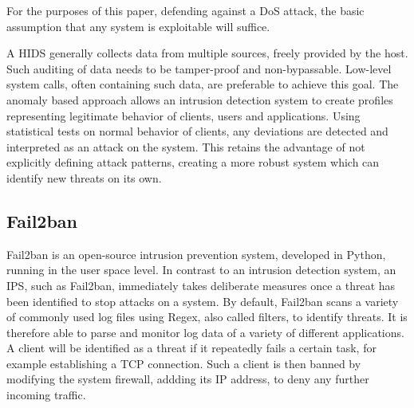 For the purposes of this paper, defending against a \ac{DoS} attack, the basic assumption that any system is exploitable will suffice.

A \ac{HIDS} generally collects data from multiple sources, freely provided by the host.
Such auditing of data needs to be tamper-proof and non-bypassable.
Low-level system calls, often containing such data, are preferable to achieve this goal.
The anomaly based approach allows an intrusion detection system to create profiles representing legitimate behavior of clients, users and applications.
Using statistical tests on normal behavior of clients, any deviations are detected and interpreted as an attack on the system.
This retains the advantage of not explicitly defining attack patterns, creating a more robust system which can identify new threats on its own.\cite{HIDPS}

\subsection{Fail2ban}
Fail2ban is an open-source intrusion prevention system, developed in Python, running in the user space level.
In contrast to an intrusion detection system, an \ac{IPS}, such as Fail2ban, immediately takes deliberate measures once a threat has been identified to stop attacks on a system.
By default, Fail2ban scans a variety of commonly used log files using \ac{Regex}, also called filters, to identify threats.
It is therefore able to parse and monitor log data of a variety of different applications.
A client will be identified as a threat if it repeatedly fails a certain task, for example establishing a \ac{TCP} connection.
Such a client is then banned by modifying the system firewall, addding its \ac{IP} address, to deny any further incoming traffic.\cite{git:fail2ban}

